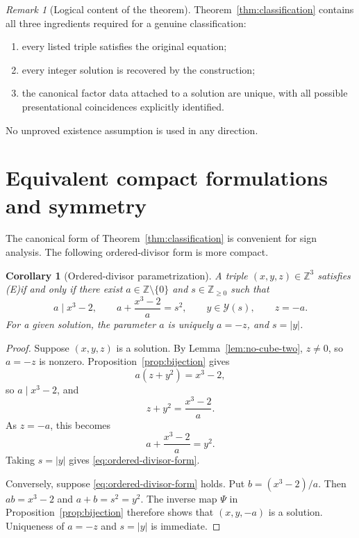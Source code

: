 \documentclass[11pt,a4paper]{article}
\newtheorem{corollary}[theorem]{Corollary}
\theoremstyle{definition}
\theoremstyle{remark}
\newtheorem{remark}[theorem]{Remark}
\newcommand{\Z}{\mathbb Z}
\newcommand{\Yset}{\mathcal Y}
\newcommand{\eqE}{\textup{(E)}}
\begin{document}
\begin{remark}[Logical content of the theorem]\label{rem:logical-content}
Theorem~\ref{thm:classification} contains all three ingredients required for
a genuine classification:

\begin{enumerate}[label=\textup{(\roman*)},leftmargin=2.5em]
\item every listed triple satisfies the original equation;
\item every integer solution is recovered by the construction;
\item the canonical factor data attached to a solution are unique, with all
possible presentational coincidences explicitly identified.
\end{enumerate}
No unproved existence assumption is used in any direction.
\end{remark}

\section{Equivalent compact formulations and symmetry}

The canonical form of Theorem~\ref{thm:classification} is convenient for sign
analysis.  The following ordered-divisor form is more compact.

\begin{corollary}[Ordered-divisor parametrization]\label{cor:ordered-divisor}
A triple $(x,y,z)\in\Z^3$ satisfies \eqE if and only if there exist
$a\in\Z\setminus\{0\}$ and $s\in\Z_{\geq0}$ such that
\begin{equation}
 a\mid x^3-2,
 \qquad
 a+\frac{x^3-2}{a}=s^2,
 \qquad
 y\in\Yset(s),
 \qquad
 z=-a.
 \label{eq:ordered-divisor-form}
\end{equation}
For a given solution, the parameter $a$ is uniquely $a=-z$, and
$s=|y|$.
\end{corollary}

\begin{proof}
Suppose $(x,y,z)$ is a solution.  By Lemma~\ref{lem:no-cube-two}, $z\neq0$,
so $a=-z$ is nonzero.  Proposition~\ref{prop:bijection} gives
\[
 a\left(z+y^2\right)=x^3-2,
\]
so $a\mid x^3-2$, and
\[
 z+y^2=\frac{x^3-2}{a}.
\]
As $z=-a$, this becomes
\[
 a+\frac{x^3-2}{a}=y^2.
\]
Taking $s=|y|$ gives \eqref{eq:ordered-divisor-form}.

Conversely, suppose \eqref{eq:ordered-divisor-form} holds.  Put
$b=(x^3-2)/a$.  Then $ab=x^3-2$ and $a+b=s^2=y^2$.  The inverse map
$\Psi$ in Proposition~\ref{prop:bijection} therefore shows that
$(x,y,-a)$ is a solution.  Uniqueness of $a=-z$ and $s=|y|$ is immediate.
\end{proof}
\end{document}
